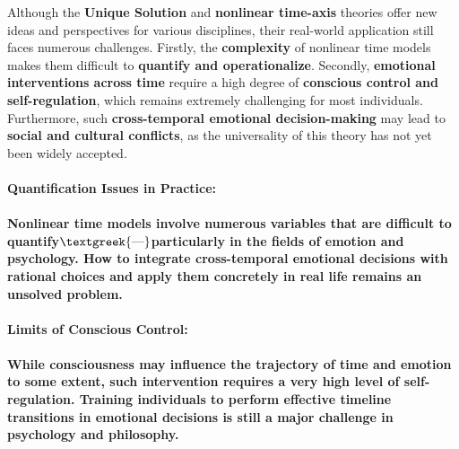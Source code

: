 \documentclass[a4paper]{article}
\begin{document}
Although the \textbf{Unique Solution} and \textbf{nonlinear time-axis} theories offer new ideas and perspectives for
various disciplines, their real-world application still faces numerous challenges. Firstly, the \textbf{complexity} of
nonlinear time models makes them difficult to \textbf{quantify and operationalize}. Secondly, \textbf{emotional
interventions across time} require a high degree of \textbf{conscious control and self-regulation}, which remains
extremely challenging for most individuals. Furthermore, such \textbf{cross-temporal emotional decision-making} may
lead to \textbf{social and cultural conflicts}, as the universality of this theory has not yet been widely accepted.

\paragraph[Quantification Issues in Practice:]{\textbf{Quantification Issues in Practice:}}
\paragraph[Nonlinear time models involve numerous variables that are difficult to
quantify$\text{\textgreek{—}}$particularly in the fields of emotion and psychology. How to integrate cross{}-temporal
emotional decisions with rational choices and apply them concretely in real life remains an unsolved
problem.]{Nonlinear time models involve numerous variables that are difficult to
quantify$\text{\textgreek{—}}$particularly in the fields of \textbf{emotion and psychology}. How to integrate
\textbf{cross-temporal emotional decisions} with \textbf{rational choices} and \textbf{apply them concretely} in real
life remains an unsolved problem.}
\paragraph[Limits of Conscious Control:]{\textbf{Limits of Conscious Control:}}
\paragraph[While consciousness may influence the trajectory of time and emotion to some extent, such intervention
requires a very high level of self{}-regulation. Training individuals to perform effective timeline transitions in
emotional decisions is still a major challenge in psychology and philosophy.]{While \textbf{consciousness} may
influence the trajectory of time and emotion to some extent, such intervention requires a \textbf{very high level of
self-regulation}. Training individuals to perform \textbf{effective timeline transitions} in emotional decisions is
still a major challenge in \textbf{psychology} and \textbf{philosophy}.}
\end{document}
